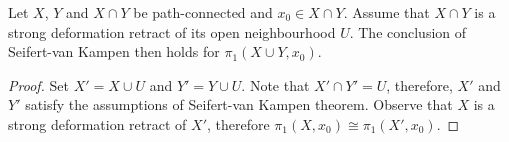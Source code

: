 
\begin{trditev}
Let $X$, $Y$ and $X \cap Y$ be path-connected and
$x_0 \in X \cap Y$. Assume that $X \cap Y$ is a strong deformation
retract of its open neighbourhood $U$. The conclusion of
Seifert-van Kampen then holds for $\pi_1(X \cup Y, x_0)$.
\end{trditev}

\begin{proof}
Set $X' = X \cup U$ and $Y' = Y \cup U$. Note that
$X' \cap Y' = U$, therefore, $X'$ and $Y'$ satisfy the assumptions
of Seifert-van Kampen theorem. Observe that $X$ is a strong
deformation retract of $X'$, therefore
$\pi_1(X, x_0) \cong \pi_1(X', x_0)$.
\end{proof}
